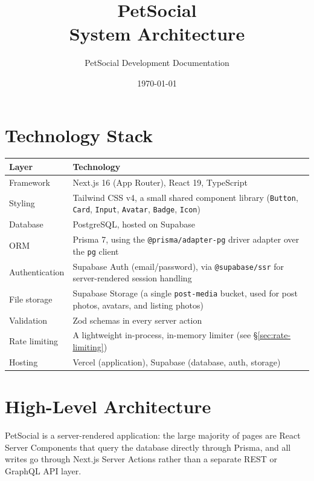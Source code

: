 \documentclass[11pt,a4paper]{article}
\title{PetSocial\\\large System Architecture}
\author{PetSocial Development Documentation}
\date{\today}
\begin{document}
\maketitle
\thispagestyle{fancy}
\tableofcontents

\section{Technology Stack}

\begin{longtable}{@{}p{3.8cm}p{10.2cm}@{}}
\toprule
\textbf{Layer} & \textbf{Technology} \\
\midrule
\endhead
Framework & Next.js 16 (App Router), React 19, TypeScript \\
Styling & Tailwind CSS v4, a small shared component library
  (\texttt{Button}, \texttt{Card}, \texttt{Input}, \texttt{Avatar}, \texttt{Badge},
  \texttt{Icon}) \\
Database & PostgreSQL, hosted on Supabase \\
ORM & Prisma 7, using the \texttt{@prisma/adapter-pg} driver adapter over the
  \texttt{pg} client \\
Authentication & Supabase Auth (email/password), via \texttt{@supabase/ssr} for
  server-rendered session handling \\
File storage & Supabase Storage (a single \texttt{post-media} bucket, used for post
  photos, avatars, and listing photos) \\
Validation & Zod schemas in every server action \\
Rate limiting & A lightweight in-process, in-memory limiter (see
  \S\ref{sec:rate-limiting}) \\
Hosting & Vercel (application), Supabase (database, auth, storage) \\
\bottomrule
\end{longtable}

\section{High-Level Architecture}

PetSocial is a server-rendered application: the large majority of pages are React
Server Components that query the database directly through Prisma, and all writes go
through Next.js Server Actions rather than a separate REST or GraphQL API layer.
\end{document}
